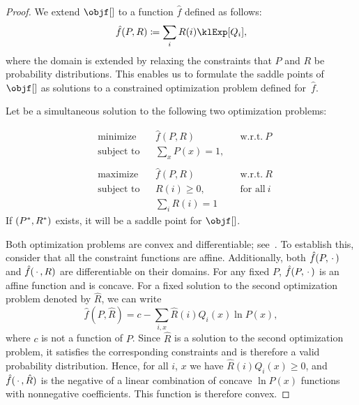 \begin{proof}
    We extend $\objf[]$ to a function $\hat{f}$ defined as follows:
    \begin{equation*}
        \hat{f}(P, R) \coloneqq \fExp,
    \end{equation*}
    where the domain is extended by relaxing the constraints that $P$ and $R$ be probability distributions.
    This enables us to formulate the saddle points of $\objf[]$ as solutions to a constrained optimization problem
    defined for~$\hat{f}$.

    Let \saddle be a simultaneous solution to the following two optimization problems:

    \begin{equation}
        \begin{aligned}
            &\text{minimize} & &\hat{f}(P,R) & &\text{w.r.t.} \ P \\
            &\text{subject to} & &\sum_{x} P(x) = 1, \\
            \\
            &\text{maximize} & &\hat{f}(P,R) & &\text{w.r.t.} \ R \\
            &\text{subject to} & &R(i) \geq 0, & &\text{for all} \ i  \\
            & & &\sum_{i} R(i) = 1 &
        \end{aligned}\label{eq:twin_optimization}
    \end{equation}
    If $(P^{*}, R^{*})$ exists, it will be a saddle point for $\objf[]$.

    Both optimization problems are convex and differentiable; see~\cite{boyd2004convex}.
    To establish this, consider that all the constraint functions are affine.
    Additionally, both $\hat{f}(P,\, \cdot \,)$ and $\hat{f}(\, \cdot \,, R)$ are differentiable on their domains.
    For any fixed $P$, $\hat{f}(P,\, \cdot \,)$ is an affine function and is concave.
    For a fixed solution to the second optimization problem denoted by $\hat{R}$, we can write
    \begin{equation*}
        \hat{f}(P,\hat{R}) = c - \sum_{i,x} \hat{R}(i) Q_i(x) \ln P(x),
    \end{equation*}
    where $c$ is not a function of $P$.
    Since $\hat{R}$ is a solution to the second optimization problem, it satisfies the corresponding constraints and
    is therefore a valid probability distribution.
    Hence, for all $i$, $x$ we have $\hat{R}(i)Q_i(x) \geq 0$, and $\hat{f}(\, \cdot \,, \hat{R})$  is
    the negative of a linear combination of concave $\ln P(x)$ functions with nonnegative coefficients.
    This function is therefore convex.


\end{proof}
